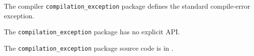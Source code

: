 
The compiler {\tt compilation\_exception} package defines the standard compile-error exception.

The {\tt compilation\_exception} package has no explicit API.

The {\tt compilation\_exception} package source code is in .

